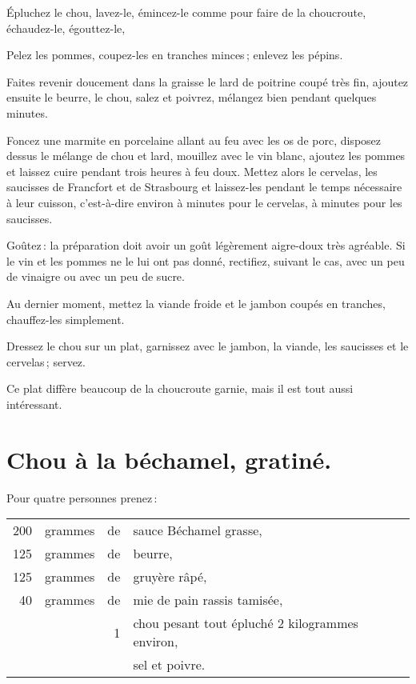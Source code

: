 Épluchez le chou, lavez-le, émincez-le comme pour faire de la choucroute,
échaudez-le, égouttez-le,

Pelez les pommes, coupez-les en tranches minces ; enlevez les pépins.

Faites revenir doucement dans la graisse le lard de poitrine coupé très fin,
ajoutez ensuite le beurre, le chou, salez et poivrez, mélangez bien pendant
quelques minutes.

Foncez une marmite en porcelaine allant au feu avec les os de porc, disposez
dessus le mélange de chou et lard, mouillez avec le vin blanc, ajoutez les
pommes et laissez cuire pendant trois heures à feu doux. Mettez alors le
cervelas, les saucisses de Francfort et de Strasbourg et laissez-les pendant le
temps nécessaire à leur cuisson, c'est-à-dire environ {\mmm}
à {\mmm} minutes pour le cervelas, {\mmm} à {\mmm} minutes
pour les saucisses.

Goûtez : la préparation doit avoir un goût légèrement aigre-doux très agréable.
Si le vin et les pommes ne le lui ont pas donné, rectifiez, suivant le cas,
avec un peu de vinaigre ou avec un peu de sucre.

Au dernier moment, mettez la viande froide et le jambon coupés en tranches,
chauffez-les simplement.

Dressez le chou sur un plat, garnissez avec le jambon, la viande, les saucisses
et le cervelas ; servez.

\medskip

Ce plat diffère beaucoup de la choucroute garnie, mais il est tout aussi
intéressant.

\section*{\centering Chou à la béchamel, gratiné.}
{}

Pour quatre personnes prenez :

\footnotesize
\begin{longtable}{rrrp{16em}}
    200 & grammes & de & sauce Béchamel grasse,                                                           \\
    125 & grammes & de & beurre,                                                                          \\
    125 & grammes & de & gruyère râpé,                                                                    \\
     40 & grammes & de & mie de pain rassis tamisée,                                                      \\
        &         &  1 & chou pesant tout épluché 2 kilogrammes environ,                                  \\
        &         &    & sel et poivre.                                                                   \\
\end{longtable}
\normalsize


